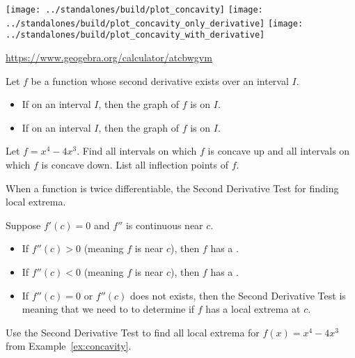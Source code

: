 \documentclass[../main.tex]{subfiles}
\begin{document}
  \begin{center}
    \texttt{[image: ../standalones/build/plot\_concavity]}
    \hfill
    \texttt{[image: ../standalones/build/plot\_concavity\_only\_derivative]}
    \hfill
    \texttt{[image: ../standalones/build/plot\_concavity\_with\_derivative]}

    \url{https://www.geogebra.org/calculator/atcbwgvm}
  \end{center}

  \begin{mdframed}[style=withref-compact]
    Let \(f\) be a function whose second derivative exists over an interval \(I\).
    \begin{itemize}
      \item If \underline{\hspace{1in}} on an interval \(I\), then the graph of \(f\) is  on \(I\).
      \item If \underline{\hspace{1in}} on an interval \(I\), then the graph of \(f\) is  on \(I\).
    \end{itemize}

  \end{mdframed}

  \begin{example} \label{ex:concavity}
    Let \(f = x^{4} - 4x^{3}\). Find all intervals on which \(f\) is concave up and all intervals on which \(f\) is concave down. List all inflection points of \(f\).

  \end{example}

  \clearpage

  When a function is twice differentiable, the Second Derivative Test  for finding local extrema.

  \begin{mdframed}[style=withref-compact]
    Suppose \(f'(c) = 0\) and \(f''\) is continuous near \(c\).
    \begin{itemize}
      \item If \(f''(c) > 0\) (meaning \(f\) is \underline{\phantom{concave down}} near \(c\)), then \(f\) has a \underline{\hspace{1in}}.
      \item If \(f''(c) < 0\) (meaning \(f\) is \underline{\phantom{concave down}} near \(c\)), then \(f\) has a \underline{\hspace{1in}}.
      \item[\faExclamationTriangle{}] If \(f''(c) = 0\) or \(f''(c)\) does not exists, then the Second Derivative Test is  meaning that we need to  to determine if \(f\) has a local extrema at \(c\).
    \end{itemize}

  \end{mdframed}

  \begin{example}
    Use the Second Derivative Test to find all local extrema for \(f(x) = x^{4} - 4x^{3}\) from Example~\ref{ex:concavity}.
  \end{example}
  \vfill
\end{document}
